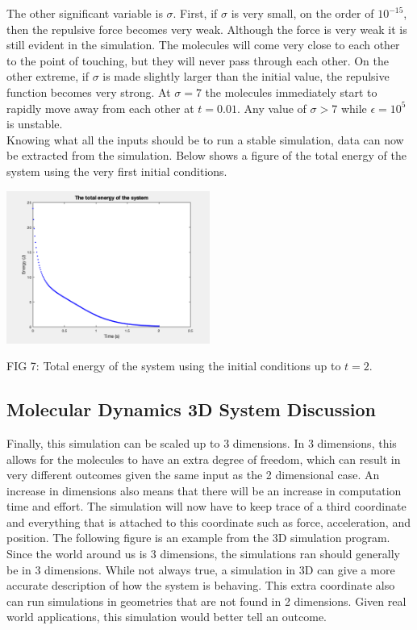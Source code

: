 \documentclass[reprint,amsmath,amssymb, aps, 10pt, a4paper, english, reqno]{revtex4-1}
\begin{document}
\begin{multicols}{2}
The other significant variable is $\sigma$. First, if $\sigma$ is very small, on the order of $10^{-15}$, then the repulsive force becomes very weak. Although the force is very weak it is still evident in the simulation. The molecules will come very close to each other to the point of touching, but they will never pass through each other. On the other extreme, if $\sigma$ is made slightly larger than the initial value, the repulsive function becomes very strong. At $\sigma = 7$ the molecules immediately start to rapidly move away from each other at $t = 0.01$. Any value of $\sigma > 7$ while $\epsilon = 10^{5}$ is unstable. \\

Knowing what all the inputs should be to run a stable simulation, data can now be extracted from the simulation. Below shows a figure of the total energy of the system using the very first initial conditions. 

\begin{center}
    \includegraphics[width=0.50\textwidth]{energy_t_2.png}
    \caption{\small FIG 7: Total energy of the system using the initial conditions up to $t = 2$.}
\end{center}



\subsection{Molecular Dynamics 3D System Discussion}

Finally, this simulation can be scaled up to 3 dimensions. In 3 dimensions, this allows for the molecules to have an extra degree of freedom, which can result in very different outcomes given the same input as the 2 dimensional case. An increase in dimensions also means that there will be an increase in computation time and effort. The simulation will now have to keep trace of a third coordinate and everything that is attached to this coordinate such as force, acceleration, and position. The following figure is an example from the 3D simulation program. Since the world around us is 3 dimensions, the simulations ran should generally be in 3 dimensions. While not always true, a simulation in 3D can give a more accurate description of how the system is behaving. This extra coordinate also can run simulations in geometries that are not found in 2 dimensions. Given real world applications, this simulation would better tell an outcome. 


\end{multicols}
\end{document}
